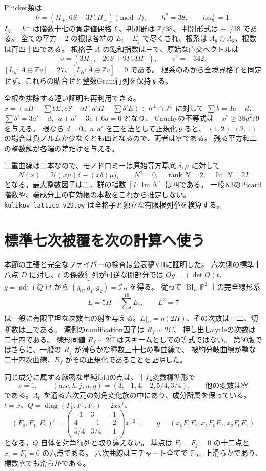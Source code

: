 Pl\"ucker類は
\[
 h=(H_+,6S+3F,H_-)\pmod J,\qquad h^2=38,
 \qquad h\alpha_8^+=1.
\]
$L_h=h^\perp$ は階数十七の負定値偶格子、判別群は $\mathbb Z/38$、
判別形式は $-1/38$ である。
全ての平方 $-2$ の根は各端の $E_i-E_j$ で尽くされ、根系は $A_8\oplus A_8$、根数は百四十四である。
根格子 $A$ の飽和指数は三で、原始な直交ベクトルは
\[
 v=(3H_+,-20S+9F,3H_-),\qquad v^2=-342.
\]
$[L_h:A\oplus\mathbb Zv]=27$、$[L_h:\overline A\oplus\mathbb Zv]=9$ である。
根系のみから全境界格子を同定せず、これらの貼合せと整数Gram行列を保持する。

全根を排除する短い証明も再利用できる。
$x=(aH-\sum bE,cS+dF,a'H-\sum b'E)\in h^\perp\cap J^\perp$ に対して
$\sum b=3a-d$、$\sum b'=3a'-d$、$a+a'+3c+6d=0$ となり、
Cauchyの不等式は $-x^2\ge38d^2/9$ を与える。
根なら $d=0$。$a,a'$ を三を法として正規化すると、
$(1,2),(2,1)$ の場合は負ノルムが少なくとも四となるので、両者は零である。
残る平方和二の整数解が各端の差だけを与える。

二重曲線は二本なので、モノドロミーは原始等方基底 $\delta,\mu$ に対して
\[
 N(x)=2\bigl((x\mu)\delta-(x\delta)\mu\bigr),\qquad
 N^2=0,\quad \operatorname{rank}N=2,\quad \operatorname{Im}N=2I
\]
となる。最大整数因子は二、群の指数 $[I:\operatorname{Im}N]$ は四である。
一般K3のPicard階数や、端成分上の有効根の本数をこれから推定しない。
\nolinkurl{kulikov_lattice_v29.py} は全格子と独立な有限根列挙を検算する。

\section{標準七次被覆を次の計算へ使う}
\label{sec:notes-septic-v29}
本節の主張と完全なファイバーの検査は公表稿VIIに証明した\cite{PaperVII}。
六次側の標準十八点 $D$ に対し、$t$ の係数行列が可逆な開部分では
$Qg=(\det Q)t$、$g=\operatorname{adj}(Q)t$ から
$\widetilde{(g_0,g_1,g_2)}=\mathcal I_D$ を得る。
従って $\operatorname{Bl}_D\mathbb P^2$ 上の完全線形系
\[
 L=5H-\sum_{1}^{18}E_i,\qquad L^2=7
\]
は一般に有限平坦な次数七の射を与える。$L|_C=\eta(2H)$、その次数は十二、切断数は三である。
源側のramification因子は $R_f\sim2\widetilde C$、
押し出しcycleの次数は二十四である。
線形同値 $R_f\sim2\widetilde C$ はスキームとしての等式ではない。
第30版ではさらに、一般の $R_f$ が滑らかな種数三十七の整曲線で、
被約分岐曲線が整な二十四次曲線、$R_f$ がその正規化であることを証明した。

同じ成分に属する厳密な単純foldの点は、十九変数標準形で
\[
 s=1,\qquad (a,c,h,j,n,q)=(3,-1,4,-2,5/4,3/4),
 \qquad\text{他の変数は零}
\]
である。$A_0$ を通る六次元の対角変化族の中にあり、成分所属を保っている。
$t=x$、$Q=\operatorname{diag}(F_0,F_1,F_2)+2xx^t$、
\[
 (F_0,F_1,F_2)^t=
 \begin{pmatrix}-1&3&-1\\4&-1&-2\\5/4&3/4&-1\end{pmatrix}x^{[2]},
 \qquad g=(x_0F_1F_2,x_1F_0F_2,x_2F_0F_1)
\]
となる。$Q$ 自体を対角行列と取り違えない。
基点は $F_i=F_j=0$ の十二点と $x_i=F_i=0$ の六点である。
六次曲線は三チャート全てで $\mathbb F_{101}$ 上滑らかであり、標数零でも滑らかである。

